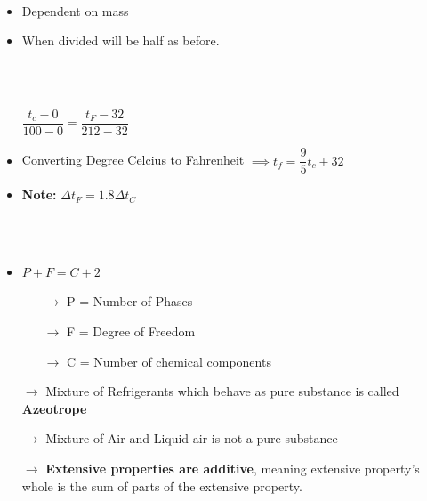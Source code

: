 \documentclass[8pt]{article}
\begin{document}
\\
	\begin{itemize}
		\item Dependent on mass
		\item When divided will be half as before. 
	\end{itemize}\hrulefill\\\\
	\begin{itemize}
		\item[] $\boxed{\dfrac{t_c-0}{100-0} = \dfrac{t_F-32}{212-32}}$
		\item Converting Degree Celcius to Fahrenheit $\implies\boxed{t_f = \dfrac{9}{5}t_c+32}$
		\item \textbf{Note:} $\boxed{\Delta t_F = 1.8\Delta t_C}$
	\end{itemize}\hrulefill\\\\
	\begin{itemize}
		\item $\boxed{P+F = C+2}$
			\begin{itemize}
				\item[$\rightarrow$] P = Number of Phases
				\item[$\rightarrow$] F = Degree of Freedom 
				\item[$\rightarrow$] C = Number of chemical components
			\end{itemize}
	\end{itemize}
\begin{itemize}
	\item[$\rightarrow$] Mixture of Refrigerants which behave as pure substance is called \textbf{Azeotrope}
	\item[$\rightarrow$] Mixture of Air and Liquid air is not a pure substance
	\item[$\rightarrow$] \textbf{Extensive properties are additive}, meaning extensive property's whole is the sum of parts of the extensive property.
\end{itemize}\hrulefill\\\\
\end{document}
